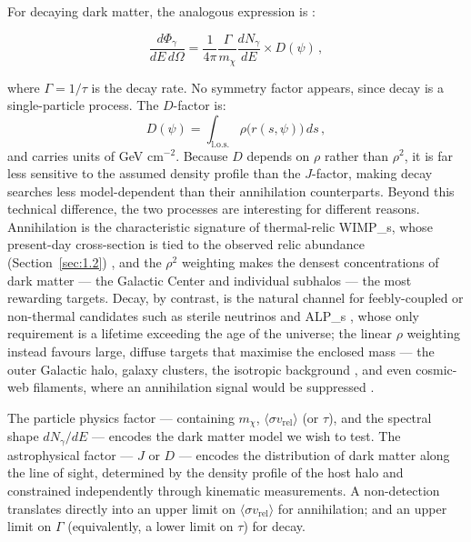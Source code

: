 For decaying dark matter, the analogous expression is \cite{Pinetti:2021jjs}:

\begin{equation}
	\frac{d\Phi_\gamma}{dE\, d\Omega} = \frac{1}{4\pi} \frac{\Gamma}{m_\chi} \frac{dN_\gamma}{dE} \times D(\psi) \,,
	\label{eq:flux_dec}
\end{equation}

where $\Gamma = 1/\tau$ is the decay rate.
No symmetry factor appears, since decay is a single-particle process.
The $D$-factor is:
%
\begin{equation}
	D(\psi) = \int_\text{l.o.s.} \rho\bigl(r(s, \psi)\bigr) \, ds \,,
	\label{eq:dfactor}
\end{equation}
%
and carries units of GeV cm$^{-2}$.
Because $D$ depends on $\rho$ rather than $\rho^2$, it is far less sensitive to the assumed density profile than the $J$-factor, making decay searches less model-dependent than their annihilation counterparts.
Beyond this technical difference, the two processes are interesting for different reasons.
Annihilation is the characteristic signature of thermal-relic \glspl{WIMP_}, whose present-day cross-section is tied to the observed relic abundance (Section~\ref{sec:1.2}) \cite{Bertone:2004pz}, and the $\rho^2$ weighting makes the densest concentrations of dark matter --- the Galactic Center and individual subhalos --- the most rewarding targets.
Decay, by contrast, is the natural channel for feebly-coupled or non-thermal candidates such as sterile neutrinos \cite{Dodelson:1993je,Boyarsky:2018tvu} and \glspl{ALP_} \cite{Arias:2012az}, whose only requirement is a lifetime exceeding the age of the universe; the linear $\rho$ weighting instead favours large, diffuse targets that maximise the enclosed mass --- the outer Galactic halo, galaxy clusters, the isotropic background \cite{Ibarra:2013cra}, and even cosmic-web filaments, where an annihilation signal would be suppressed \cite{Pinetti:2021jjs}.

The particle physics factor --- containing $m_\chi$, $\langle \sigma v_\text{rel} \rangle$ (or $\tau$), and the spectral shape $dN_\gamma/dE$ --- encodes the dark matter model we wish to test.
The astrophysical factor --- $J$ or $D$ --- encodes the distribution of dark matter along the line of sight, determined by the density profile of the host halo and constrained independently through kinematic measurements.
A non-detection translates directly into an upper limit on $\langle \sigma v_\text{rel} \rangle$ for annihilation; and an upper limit on $\Gamma$ (equivalently, a lower limit on $\tau$) for decay.

